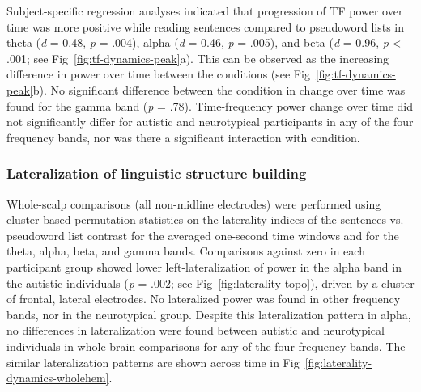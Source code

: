 Subject-specific regression analyses indicated that progression of TF power over time was more positive while reading sentences compared to pseudoword lists in theta (\textit{d} = 0.48, \textit{p} = .004), alpha (\textit{d} = 0.46, \textit{p} = .005), and beta (\textit{d} = 0.96, \textit{p} <  .001; see Fig~\ref{fig:tf-dynamics-peak}a). This can be observed as the increasing difference in power over time between the conditions (see Fig~\ref{fig:tf-dynamics-peak}b). No significant difference between the condition in change over time was found for the gamma band (\textit{p} = .78). Time-frequency power change over time did not significantly differ for autistic and neurotypical participants in any of the four frequency bands, nor was there a significant interaction with condition. 



\subsubsection{Lateralization of linguistic structure building}
Whole-scalp comparisons (all non-midline electrodes) were performed using cluster-based permutation statistics on the laterality indices of the sentences vs. pseudoword list contrast for the averaged one-second time windows and for the theta, alpha, beta, and gamma bands. Comparisons against zero in each participant group showed lower left-lateralization of power in the alpha band in the autistic individuals (\textit{p} = .002; see Fig~\ref{fig:laterality-topo}), driven by a cluster of frontal, lateral electrodes. No lateralized power was found in other frequency bands, nor in the neurotypical group. Despite this lateralization pattern in alpha, no differences in lateralization were found between autistic and neurotypical individuals in whole-brain comparisons for any of the four frequency bands. The similar lateralization patterns are shown across time in Fig~\ref{fig:laterality-dynamics-wholehem}.



\vspace{.5cm}

 

